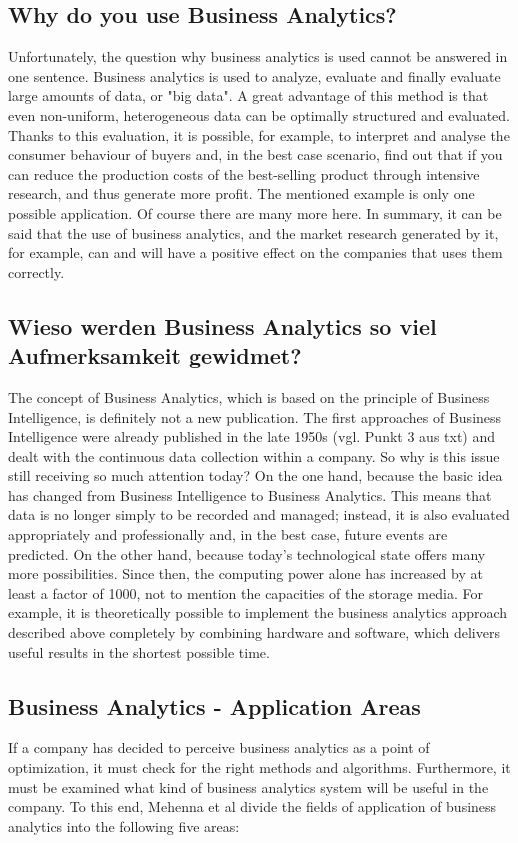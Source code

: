 \documentclass[12pt,twocolumn,twoside]{conference}   %
\begin{document}
\subsection{Why do you use Business Analytics?}
Unfortunately, the question why business analytics is used cannot be answered in one sentence. Business analytics is used to analyze, evaluate and finally evaluate large amounts of data, or "big data". A great advantage of this method is that even non-uniform, heterogeneous data can be optimally structured and evaluated. Thanks to this evaluation, it is possible, for example, to interpret and analyse the consumer behaviour of buyers and, in the best case scenario, find out that if you can reduce the production costs of the best-selling product through intensive research, and thus generate more profit. The mentioned example is only one possible application. Of course there are many more here. In summary, it can be said that the use of business analytics, and the market research generated by it, for example, can and will have a positive effect on the companies that uses them correctly.

\subsection{Wieso werden Business Analytics so viel Aufmerksamkeit gewidmet?}
The concept of Business Analytics, which is based on the principle of Business Intelligence, is definitely not a new publication. The first approaches of Business Intelligence were already published in the late 1950s (vgl. Punkt 3 aus txt) and dealt with the continuous data collection within a company. So why is this issue still receiving so much attention today? On the one hand, because the basic idea has changed from Business Intelligence to Business Analytics. This means that data is no longer simply to be recorded and managed; instead, it is also evaluated appropriately and professionally and, in the best case, future events are predicted.  On the other hand, because today's technological state offers many more possibilities. Since then, the computing power alone has increased by at least a factor of 1000, not to mention the capacities of the storage media.  For example, it is theoretically possible to implement the business analytics approach described above completely by combining hardware and software, which delivers useful results in the shortest possible time.

\subsection{Business Analytics - Application Areas}
If a company has decided to perceive business analytics as a point of optimization, it must check for the right methods and algorithms. Furthermore, it must be examined what kind of business analytics system will be useful in the company. To this end, Mehenna et al divide the fields of application of business analytics into the following five areas:
\end{document}
